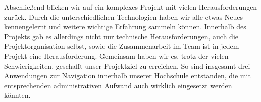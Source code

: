 
Abschließend blicken wir auf ein komplexes Projekt mit vielen Herausforderungen zurück. Durch die unterschiedlichen Technologien haben wir alle etwas Neues kennengelernt und weitere wichtige Erfahrung sammeln können. Innerhalb des Projekts gab es allerdings nicht nur technische Herausforderungen, auch die Projektorganisation selbst, sowie die Zusammenarbeit im Team ist in jedem Projekt eine Herausforderung. Gemeinsam haben wir es, trotz der vielen Schwierigkeiten, geschafft unser Projektziel zu erreichen. So sind insgesamt drei Anwendungen zur Navigation innerhalb unserer Hochschule entstanden, die mit entsprechenden administrativen Aufwand auch wirklich eingesetzt werden könnten.